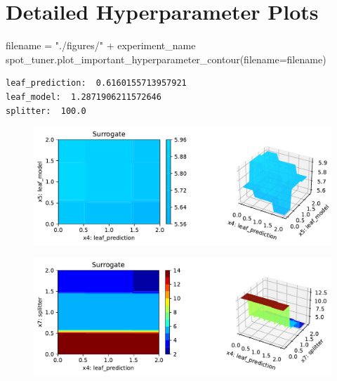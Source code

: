 \documentclass[
  letterpaper,
  DIV=11,
  numbers=noendperiod]{scrreprt}
\newenvironment{Shaded}{\begin{snugshade}}{\end{snugshade}}
\newcommand{\NormalTok}[1]{\textcolor[rgb]{0.00,0.23,0.31}{#1}}
\newcommand{\OperatorTok}[1]{\textcolor[rgb]{0.37,0.37,0.37}{#1}}
\newcommand{\StringTok}[1]{\textcolor[rgb]{0.13,0.47,0.30}{#1}}
\begin{document}
\hypertarget{detailed-hyperparameter-plots-1}{%
\section{Detailed Hyperparameter
Plots}\label{detailed-hyperparameter-plots-1}}

\begin{Shaded}
\begin{Highlighting}[]
\NormalTok{filename }\OperatorTok{=} \StringTok{"./figures/"} \OperatorTok{+}\NormalTok{ experiment\_name}
\NormalTok{spot\_tuner.plot\_important\_hyperparameter\_contour(filename}\OperatorTok{=}\NormalTok{filename)}
\end{Highlighting}
\end{Shaded}

\begin{verbatim}
leaf_prediction:  0.6160155713957921
leaf_model:  1.2871906211572646
splitter:  100.0
\end{verbatim}

\begin{figure}[H]

{\centering \includegraphics{13_spot_hpt_river_files/figure-pdf/cell-44-output-2.pdf}

}

\end{figure}

\begin{figure}[H]

{\centering \includegraphics{13_spot_hpt_river_files/figure-pdf/cell-44-output-3.pdf}

}

\end{figure}
\end{document}
